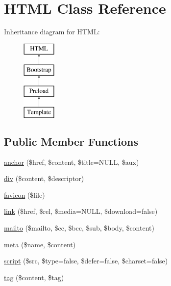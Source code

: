 \hypertarget{class_w_a_f_f_l_e_1_1_framework_1_1_engines_1_1_h_t_m_l}{}\section{H\+T\+ML Class Reference}
\label{class_w_a_f_f_l_e_1_1_framework_1_1_engines_1_1_h_t_m_l}
Inheritance diagram for H\+T\+ML\+:\begin{figure}[H]
\begin{center}
\leavevmode
\includegraphics[height=4.000000cm]{class_w_a_f_f_l_e_1_1_framework_1_1_engines_1_1_h_t_m_l}
\end{center}
\end{figure}
\subsection*{Public Member Functions}
\begin{DoxyCompactItemize}
\item 
\hyperlink{class_w_a_f_f_l_e_1_1_framework_1_1_engines_1_1_h_t_m_l_a3c534563b3b17abd31c70ce81c518a6d}{anchor} (\$href, \$content, \$title=N\+U\+LL, \$aux)
\item 
\hyperlink{class_w_a_f_f_l_e_1_1_framework_1_1_engines_1_1_h_t_m_l_a12602b493053197597cfcaffa61a6e14}{div} (\$content, \$descriptor)
\item 
\hyperlink{class_w_a_f_f_l_e_1_1_framework_1_1_engines_1_1_h_t_m_l_a3f5f65b7897f31a9a6eae79588a9e6c5}{favicon} (\$file)
\item 
\hyperlink{class_w_a_f_f_l_e_1_1_framework_1_1_engines_1_1_h_t_m_l_a7596de1be94a6dc237fa4d435193da8b}{link} (\$href, \$rel, \$media=N\+U\+LL, \$download=false)
\item 
\hyperlink{class_w_a_f_f_l_e_1_1_framework_1_1_engines_1_1_h_t_m_l_a77b7fda51b7845d6a6c738efc5d248ff}{mailto} (\$mailto, \$cc, \$bcc, \$sub, \$body, \$content)
\item 
\hyperlink{class_w_a_f_f_l_e_1_1_framework_1_1_engines_1_1_h_t_m_l_af2959b14380c3635ed932a5d1b877bd8}{meta} (\$name, \$content)
\item 
\hyperlink{class_w_a_f_f_l_e_1_1_framework_1_1_engines_1_1_h_t_m_l_a9a92856db6ac937a9dace60224dfaf65}{script} (\$src, \$type=false, \$defer=false, \$charset=false)
\item 
\hyperlink{class_w_a_f_f_l_e_1_1_framework_1_1_engines_1_1_h_t_m_l_a61aeb234b0eb5d6895f91ba5b533bfce}{tag} (\$content, \$tag)
\end{DoxyCompactItemize}


